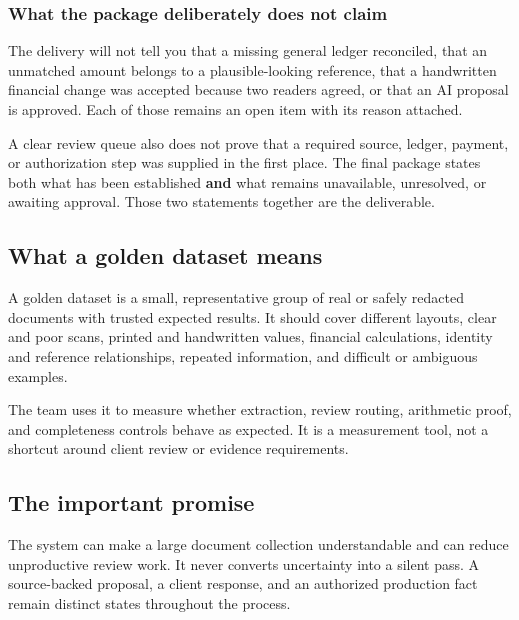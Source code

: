 \documentclass[
]{article}
\begin{document}
\subsubsection{What the package deliberately does not
claim}\label{what-the-package-deliberately-does-not-claim}

The delivery will not tell you that a missing general ledger reconciled,
that an unmatched amount belongs to a plausible-looking reference, that
a handwritten financial change was accepted because two readers agreed,
or that an AI proposal is approved. Each of those remains an open item
with its reason attached.

A clear review queue also does not prove that a required source, ledger,
payment, or authorization step was supplied in the first place. The
final package states both what has been established \textbf{and} what
remains unavailable, unresolved, or awaiting approval. Those two
statements together are the deliverable.

\subsection{What a golden dataset
means}\label{what-a-golden-dataset-means}

A golden dataset is a small, representative group of real or safely
redacted documents with trusted expected results. It should cover
different layouts, clear and poor scans, printed and handwritten values,
financial calculations, identity and reference relationships, repeated
information, and difficult or ambiguous examples.

The team uses it to measure whether extraction, review routing,
arithmetic proof, and completeness controls behave as expected. It is a
measurement tool, not a shortcut around client review or evidence
requirements.

\subsection{The important promise}\label{the-important-promise}

The system can make a large document collection understandable and can
reduce unproductive review work. It never converts uncertainty into a
silent pass. A source-backed proposal, a client response, and an
authorized production fact remain distinct states throughout the
process.
\end{document}
